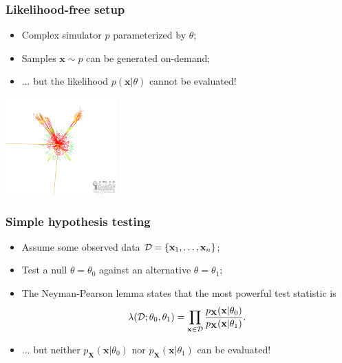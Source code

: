 \documentclass{beamer}
\begin{document}
\begin{frame}
    \frametitle{Likelihood-free setup}

    \begin{itemize}
        \item Complex simulator $p$ parameterized by $\theta$;
        \item Samples $\mathbf{x} \sim p$ can be generated on-demand;
        \item ... but the likelihood {\color{red} $p(\mathbf{x}|\theta)$ cannot be evaluated}!
    \end{itemize}

    \centering
    \includegraphics[height=10em]{figures/sim-boson.jpg}

\end{frame}

\begin{frame}
    \frametitle{Simple hypothesis testing}

    \begin{itemize}
        \item Assume some observed data ${\cal D} = \{ \mathbf{x}_1, \dots, \mathbf{x}_n \}$;
        \item Test a null $\theta = \theta_0$ against an alternative $\theta = \theta_1$;
        \item The Neyman-Pearson lemma states that the most powerful test statistic is
            $$
            \lambda({\cal D}; \theta_0, \theta_1) = \prod_{\mathbf{x} \in {\cal D}} \frac{ p_\mathbf{X}(\mathbf{x}|\theta_0)}{ p_\mathbf{X}(\mathbf{x}|\theta_1)}.
            $$
        \item ... but neither $p_\mathbf{X}(\mathbf{x}|\theta_0)$ nor $p_\mathbf{X}(\mathbf{x}|\theta_1)$ can be evaluated!

    \end{itemize}

\end{frame}
\end{document}
